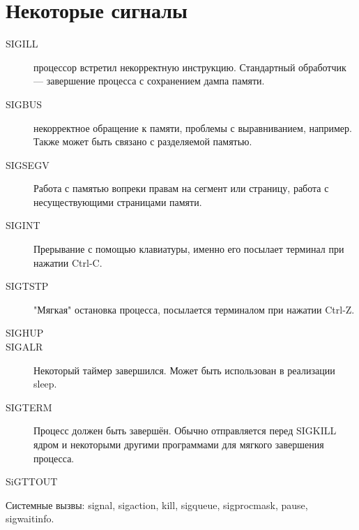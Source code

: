 \documentclass[main]{subfiles}
\begin{document}
\section{Некоторые сигналы}
\begin{description}
\item[SIGILL] процессор встретил некорректную инструкцию.
Стандартный обработчик --- завершение процесса с сохранением дампа памяти.
\item[SIGBUS] некорректное обращение к памяти, проблемы с выравниванием, например.
Также может быть связано с разделяемой памятью.
\item[SIGSEGV] Работа с памятью вопреки правам на сегмент или страницу, работа
с несуществующими страницами памяти.
\item[SIGINT] Прерывание с помощью клавиатуры, именно его посылает терминал
при нажатии Ctrl-C.
\item[SIGTSTP] "Мягкая" остановка процесса, посылается терминалом при нажатии Ctrl-Z.
\item[SIGHUP]
\item[SIGALR] Некоторый таймер завершился. Может быть использован в реализации sleep.
\item[SIGTERM] Процесс должен быть завершён. Обычно отправляется перед SIGKILL
ядром и некоторыми другими программами для мягкого завершения процесса.
\item[SiGTTOUT]
\end{description}

Системные вызвы: signal, sigaction, kill, sigqueue, sigprocmask, pause,
sigwaitinfo.
\end{document}
